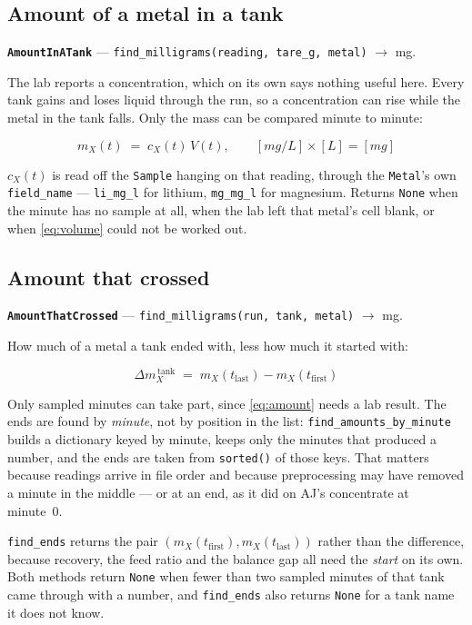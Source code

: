 \subsection{Amount of a metal in a tank}

\textbf{\texttt{AmountInATank}} --- \texttt{find\_milligrams(reading, tare\_g, metal)}
$\rightarrow$ mg.

The lab reports a concentration, which on its own says nothing useful here. Every tank gains and
loses liquid through the run, so a concentration can rise while the metal in the tank falls. Only
the mass can be compared minute to minute:

\begin{equation}
  m_X(t) \;=\; c_X(t)\,V(t),
  \qquad [\unit{mg/L}] \times [\unit{L}] = [\unit{mg}]
  \label{eq:amount}
\end{equation}

$c_X(t)$ is read off the \texttt{Sample} hanging on that reading, through the \texttt{Metal}'s
own \texttt{field\_name} --- \texttt{li\_mg\_l} for lithium, \texttt{mg\_mg\_l} for magnesium.
Returns \texttt{None} when the minute has no sample at all, when the lab left that metal's cell
blank, or when \eqref{eq:volume} could not be worked out.

\subsection{Amount that crossed}

\textbf{\texttt{AmountThatCrossed}} --- \texttt{find\_milligrams(run, tank, metal)}
$\rightarrow$ mg.

How much of a metal a tank ended with, less how much it started with:

\begin{equation}
  \Delta m_X^{\,\mathrm{tank}} \;=\; m_X(t_\mathrm{last}) - m_X(t_\mathrm{first})
  \label{eq:crossed}
\end{equation}

Only sampled minutes can take part, since \eqref{eq:amount} needs a lab result. The ends are
found by \emph{minute}, not by position in the list: \texttt{find\_amounts\_by\_minute} builds a
dictionary keyed by minute, keeps only the minutes that produced a number, and the ends are taken
from \texttt{sorted()} of those keys. That matters because readings arrive in file order and
because preprocessing may have removed a minute in the middle --- or at an end, as it did on
AJ's concentrate at minute~0.

\texttt{find\_ends} returns the pair $(m_X(t_\mathrm{first}), m_X(t_\mathrm{last}))$ rather than
the difference, because recovery, the feed ratio and the balance gap all need the \emph{start}
on its own. Both methods return \texttt{None} when fewer than two sampled minutes of that tank
came through with a number, and \texttt{find\_ends} also returns \texttt{None} for a tank name
it does not know.


